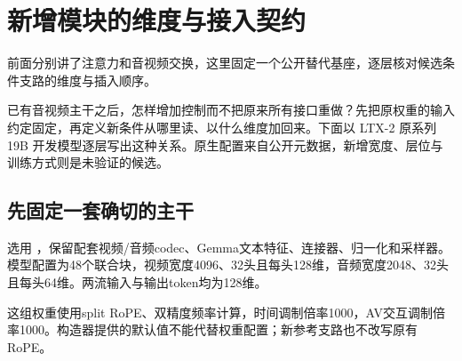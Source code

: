 \chapter{新增模块的维度与接入契约}\label{seedance-m21}

前面分别讲了注意力和音视频交换，这里固定一个公开替代基座，逐层核对候选条件支路的维度与插入顺序。

已有音视频主干之后，怎样增加控制而不把原来所有接口重做？先把原权重的输入约定固定，再定义新条件从哪里读、以什么维度加回来。下面以 LTX-2 原系列 19B 开发模型逐层写出这种关系。原生配置来自公开元数据，新增宽度、层位与训练方式则是未验证的候选。

\section{先固定一套确切的主干}\label{seedance-m21-ux5148ux56faux5b9aux4e00ux5957ux786eux5207ux7684ux4e3bux5e72}

选用 ，保留配套视频/音频codec、Gemma文本特征、连接器、归一化和采样器。模型配置为48个联合块，视频宽度4096、32头且每头128维，音频宽度2048、32头且每头64维。两流输入与输出token均为128维。

这组权重使用split RoPE、双精度频率计算，时间调制倍率1000，AV交互调制倍率1000。构造器提供的默认值不能代替权重配置；新参考支路也不改写原有RoPE。

